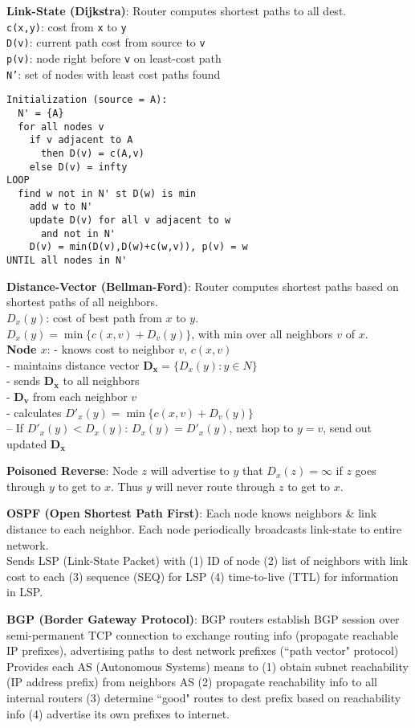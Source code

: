 \documentclass{scrartcl}
\begin{document}
\begin{multicols*}{3}
{\bf Link-State (Dijkstra)}: Router computes shortest paths to all dest. \\
\texttt{c(x,y)}: cost from \texttt{x} to \texttt{y} \\
\texttt{D(v)}: current path cost from source to \texttt{v} \\
\texttt{p(v)}: node right before \texttt{v} on least-cost path \\
\texttt{N'}: set of nodes with least cost paths found
\begin{verbatim}
Initialization (source = A):
  N' = {A}
  for all nodes v
    if v adjacent to A
      then D(v) = c(A,v)
    else D(v) = infty
LOOP
  find w not in N' st D(w) is min
    add w to N'
    update D(v) for all v adjacent to w
      and not in N'
    D(v) = min(D(v),D(w)+c(w,v)), p(v) = w
UNTIL all nodes in N'
\end{verbatim}

{\bf Distance-Vector (Bellman-Ford)}: Router computes shortest paths based on shortest paths of all neighbors. \\
$D_x(y)$: cost of best path from $x$ to $y$. \\
$D_x(y)=\min\{c(x,v)+D_v(y)\}$, with min over all neighbors $v$ of $x$.\\
{\bf Node $x$}: - knows cost to neighbor $v$, $c(x,v)$\\
- maintains distance vector $\bm{D_x}=\{D_x(y):y\in N\}$ \\
- sends $\bm{D_x}$ to all neighbors\\
- $\bm{D_v}$ from each neighbor $v$ \\
- calculates $D'_x(y)=\min\{c(x,v)+D_v(y)\}$ \\
-- If $D'_x(y)<D_x(y)$: $D_x(y) = D'_x(y)$, next hop to $y=v$, send out updated $\bm{D_x}$

{\bf Poisoned Reverse}: Node $z$ will advertise to $y$ that $D_x(z)=\infty$ if $z$ goes through $y$ to get to $x$. Thus $y$ will never route through $z$ to get to $x$.


{\bf OSPF (Open Shortest Path First)}: Each node knows neighbors \& link distance to each neighbor. Each node periodically broadcasts link-state to entire network. \\
Sends LSP (Link-State Packet) with (1) ID of node (2) list of neighbors with link cost to each (3) sequence (SEQ) for LSP (4) time-to-live (TTL) for information in LSP.

{\bf BGP (Border Gateway Protocol)}: BGP routers establish BGP session over semi-permanent TCP connection to exchange routing info (propagate reachable IP prefixes), advertising paths to dest network prefixes (``path vector" protocol) \\
Provides each AS (Autonomous Systems) means to (1) obtain subnet reachability (IP address prefix) from neighbors AS (2) propagate reachability info to all internal routers (3) determine ``good" routes to dest prefix based on reachability info (4) advertise its own prefixes to internet.


\end{multicols*}
\end{document}
